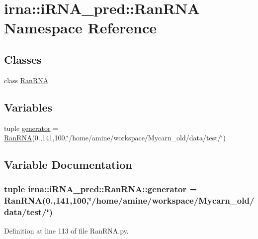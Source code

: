 \hypertarget{namespaceirna_1_1iRNA__pred_1_1RanRNA}{
\section{irna\-:\-:i\-R\-N\-A\-\_\-pred\-:\-:\-Ran\-R\-N\-A \-Namespace \-Reference}
\label{namespaceirna_1_1iRNA__pred_1_1RanRNA}
}
\subsection*{\-Classes}
\begin{DoxyCompactItemize}
\item 
class \hyperlink{classirna_1_1iRNA__pred_1_1RanRNA_1_1RanRNA}{\-Ran\-R\-N\-A}
\end{DoxyCompactItemize}
\subsection*{\-Variables}
\begin{DoxyCompactItemize}
\item 
tuple \hyperlink{namespaceirna_1_1iRNA__pred_1_1RanRNA_a0acdd01718f571a9fd380a6d94910655}{generator} = \hyperlink{classirna_1_1iRNA__pred_1_1RanRNA_1_1RanRNA}{\-Ran\-R\-N\-A}(0.,141,100,\char`\"{}/home/amine/workspace/\-Mycarn\-\_\-old/data/test/\char`\"{})
\end{DoxyCompactItemize}


\subsection{\-Variable \-Documentation}
\hypertarget{namespaceirna_1_1iRNA__pred_1_1RanRNA_a0acdd01718f571a9fd380a6d94910655}{
\subsubsection[{generator}]{\setlength{\rightskip}{0pt plus 5cm}tuple {\bf irna\-::i\-R\-N\-A\-\_\-pred\-::\-Ran\-R\-N\-A\-::generator} = {\bf \-Ran\-R\-N\-A}(0.,141,100,\char`\"{}/home/amine/workspace/\-Mycarn\-\_\-old/data/test/\char`\"{})}}
\label{namespaceirna_1_1iRNA__pred_1_1RanRNA_a0acdd01718f571a9fd380a6d94910655}


\-Definition at line 113 of file \-Ran\-R\-N\-A.\-py.

